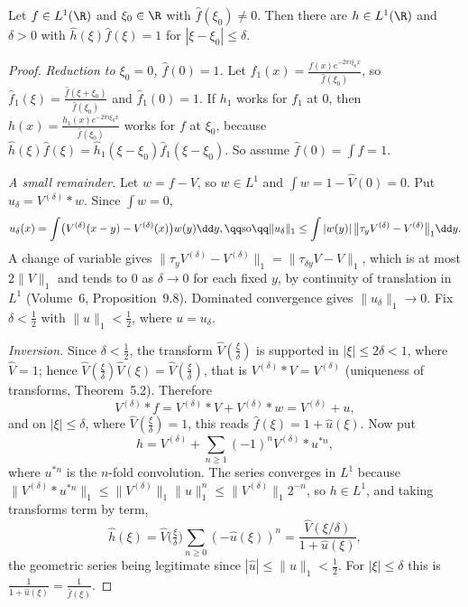\begin{lemma}\label{lem:localinv}
Let $f\in L^1(\R)$ and $\xi_0\in\R$ with $\hat f(\xi_0)\ne0$. Then there are $h\in L^1(\R)$ and $\delta>0$ with $\hat h(\xi)\hat f(\xi)=1$ for $|\xi-\xi_0|\le\delta$.
\end{lemma}
\begin{proof}
\emph{Reduction to $\xi_0=0$, $\hat f(0)=1$.} Let $f_1(x)=\frac{f(x)e^{-2\pi i\xi_0x}}{\hat f(\xi_0)}$, so $\hat f_1(\xi)=\frac{\hat f(\xi+\xi_0)}{\hat f(\xi_0)}$ and
$\hat f_1(0)=1$. If $h_1$ works for $f_1$ at $0$, then $h(x)=\frac{h_1(x)e^{-2\pi i\xi_0x}}{\hat f(\xi_0)}$ works for $f$ at $\xi_0$, because
$\hat h(\xi)\hat f(\xi)=\hat h_1(\xi-\xi_0)\hat f_1(\xi-\xi_0)$. So assume $\hat f(0)=\int f=1$.

\emph{A small remainder.} Let $w=f-V$, so $w\in L^1$ and $\int w=1-\hat V(0)=0$. Put $u_\delta=V^{(\delta)}*w$. Since $\int w=0$,
\[
u_\delta(x)=\int\bigl(V^{(\delta)}(x-y)-V^{(\delta)}(x)\bigr)w(y)\dd y,\qq\text{so}\qq\|u_\delta\|_1\le\int|w(y)|\,\bigl\|\tau_yV^{(\delta)}-V^{(\delta)}\bigr\|_1\dd y.
\]
A change of variable gives $\|\tau_yV^{(\delta)}-V^{(\delta)}\|_1=\|\tau_{\delta y}V-V\|_1$, which is at most $2\|V\|_1$ and tends to $0$ as $\delta\to0$ for each fixed $y$,
by continuity of translation in $L^1$ (Volume~6, Proposition~9.8). Dominated convergence gives $\|u_\delta\|_1\to0$. Fix $\delta<\frac12$ with $\|u\|_1<\frac12$, where
$u=u_\delta$.

\emph{Inversion.} Since $\delta<\frac12$, the transform $\hat V(\frac\xi\delta)$ is supported in $|\xi|\le2\delta<1$, where $\hat V=1$; hence
$\hat V(\frac\xi\delta)\hat V(\xi)=\hat V(\frac\xi\delta)$, that is $V^{(\delta)}*V=V^{(\delta)}$ (uniqueness of transforms, Theorem~5.2). Therefore
\[
V^{(\delta)}*f=V^{(\delta)}*V+V^{(\delta)}*w=V^{(\delta)}+u,
\]
and on $|\xi|\le\delta$, where $\hat V(\frac\xi\delta)=1$, this reads $\hat f(\xi)=1+\hat u(\xi)$. Now put
\[
h=V^{(\delta)}+\sum_{n\ge1}(-1)^nV^{(\delta)}*u^{*n},
\]
where $u^{*n}$ is the $n$-fold convolution. The series converges in $L^1$ because $\|V^{(\delta)}*u^{*n}\|_1\le\|V^{(\delta)}\|_1\|u\|_1^n\le\|V^{(\delta)}\|_1 2^{-n}$, so
$h\in L^1$, and taking transforms term by term,
\[
\hat h(\xi)=\hat V\bigl(\tfrac\xi\delta\bigr)\sum_{n\ge0}(-\hat u(\xi))^n=\frac{\hat V(\xi/\delta)}{1+\hat u(\xi)},
\]
the geometric series being legitimate since $|\hat u|\le\|u\|_1<\frac12$. For $|\xi|\le\delta$ this is $\frac1{1+\hat u(\xi)}=\frac1{\hat f(\xi)}$.
\end{proof}


